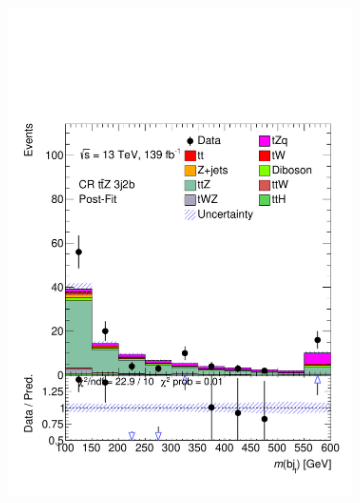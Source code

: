 \begin{figure}[!h]
\begin{subfigure}[b]{0.33\linewidth}
    \includegraphics[width=\textwidth]{ubonn-thesis/Chapters/Chapters_08/appendix/data/CR_3j2b_postFit.pdf} 
  \end{subfigure} 
  \newline
  \begin{subfigure}[b]{0.33\linewidth}
    \centering

\end{subfigure}
\end{figure}
